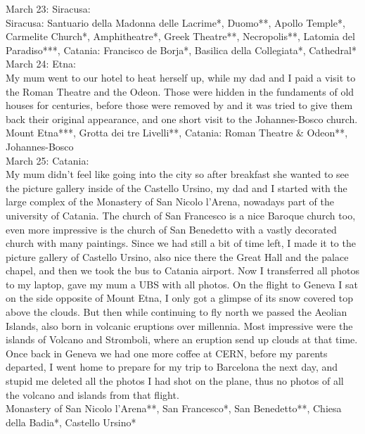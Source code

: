 March 23: Siracusa:\\
Siracusa: Santuario della Madonna delle Lacrime*, Duomo**, Apollo Temple*, Carmelite Church*, Amphitheatre*, Greek Theatre**, Necropolis**, Latomia del Paradiso***, Catania: Francisco de Borja*, Basilica della Collegiata*, Cathedral*\\

March 24: Etna:\\
My mum went to our hotel to heat herself up, while my dad and I paid a visit to the Roman Theatre and the Odeon. Those were hidden in the fundaments of old houses for centuries, before those were removed by and it was tried to give them back their original appearance, and one short visit to the Johannes-Bosco church.\\

Mount Etna***, Grotta dei tre Livelli**, Catania: Roman Theatre \& Odeon**, Johannes-Bosco\\

March 25: Catania:\\
My mum didn't feel like going into the city so after breakfast she wanted to see the picture gallery inside of the Castello Ursino, my dad and I started with the large complex of the Monastery of San Nicolo l'Arena, nowadays part of the university of Catania. The church of San Francesco is a nice Baroque church too, even more impressive is the church of San Benedetto with a vastly decorated church with many paintings. Since we had still a bit of time left, I made it to the picture gallery of Castello Ursino, also nice there the Great Hall and the palace chapel, and then we took the bus to Catania airport. Now I transferred all photos to my laptop, gave my mum a UBS with all photos. On the flight to Geneva I sat on the side opposite of Mount Etna, I only got a glimpse of its snow covered top above the clouds. But then while continuing to fly north we passed the Aeolian Islands, also born in volcanic eruptions over millennia. Most impressive were the islands of Volcano and Stromboli, where an eruption send up clouds at that time. Once back in Geneva we had one more coffee at CERN, before my parents departed, I went home to prepare for my trip to Barcelona the next day, and stupid me deleted all the photos I had shot on the plane, thus no photos of all the volcano and islands from that flight.\\

Monastery of San Nicolo l'Arena**, San Francesco*, San Benedetto**, Chiesa della Badia*, Castello Ursino*

